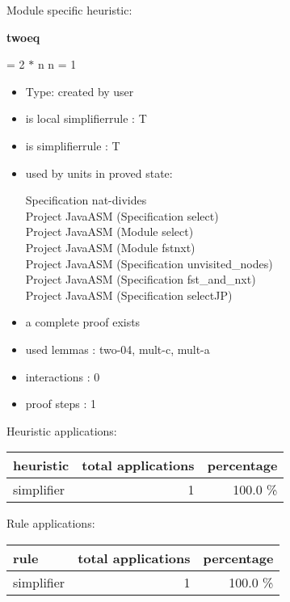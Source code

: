 \documentclass[a4paper]{article}
\begin{document}
Module specific heuristic:

\pagebreak

{\LARGE\bf twoeq}\label{lemma-twoeq}

\medskip

  = 2 $*$ n \Equiv n = 1

\begin{itemize}

\item Type: created by user

\item is local simplifierrule : T
\item is simplifierrule : T
\item used by units in proved state:

Specification nat-divides \\
Project JavaASM (Specification select) \\
Project JavaASM (Module select) \\
Project JavaASM (Module fstnxt) \\
Project JavaASM (Specification unvisited\_nodes) \\
Project JavaASM (Specification fst\_and\_nxt) \\
Project JavaASM (Specification selectJP)
\item       a complete proof exists
\item       used lemmas  : two-04, mult-c, mult-a
\item       interactions : 0
\item       proof steps  : 1
\end{itemize}

\medskip


Heuristic applications:

\begin{supertabular}{l|r|r}
heuristic	& total applications & percentage \\ \hline
simplifier & 1 & 100.0 \% \\

\end{supertabular}

Rule applications:

\begin{supertabular}{l|r|r}
rule	        & total applications & percentage \\ \hline
simplifier & 1 & 100.0 \% \\

\end{supertabular}
\end{document}
